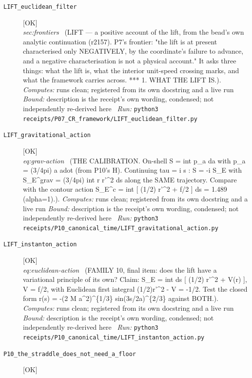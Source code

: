 \begin{description}
\item[\label{rcpt:LIFT_euclidean_filter}\texttt{LIFT\_euclidean\_filter}]\hfill\textsf{[OK]}\\
\textit{sec:frontiers} \ (LIFT --- a positive account of the lift, from the bead's own analytic continuation (r2157). P7's frontier: "the lift is at present characterised only NEGATIVELY, by the coordinate's failure to advance, and a negative characterisation is not a physical account." It asks three things: what the lift is, what the interior unit-speed crossing marks, and what the framework carries across. *** 1. WHAT THE LIFT IS.). 
\emph{Computes:} runs clean; registered from its own docstring and a live run
 \emph{Bound:} description is the receipt's own wording, condensed; not independently re-derived here
\ \emph{Run:} \texttt{python3 receipts/P07\_CR\_framework/LIFT\_euclidean\_filter.py}
\item[\label{rcpt:LIFT_gravitational_action}\texttt{LIFT\_gravitational\_action}]\hfill\textsf{[OK]}\\
\textit{eq:grav-action} \ (THE CALIBRATION. On-shell S = int p\_a da with p\_a = (3/4pi) a adot (from P10's H). Continuing tau = i s : S = -i S\_E with S\_E\textasciicircum{}grav = (3/4pi) int r r'\textasciicircum{}2 ds along the SAME trajectory. Compare with the contour action S\_E\textasciicircum{}c = int [ (1/2) r'\textasciicircum{}2 + f/2 ] ds = 1.489 (alpha=1).). 
\emph{Computes:} runs clean; registered from its own docstring and a live run
 \emph{Bound:} description is the receipt's own wording, condensed; not independently re-derived here
\ \emph{Run:} \texttt{python3 receipts/P10\_canonical\_time/LIFT\_gravitational\_action.py}
\item[\label{rcpt:LIFT_instanton_action}\texttt{LIFT\_instanton\_action}]\hfill\textsf{[OK]}\\
\textit{eq:euclidean-action} \ (FAMILY 10, final item: does the lift have a variational principle of its own? Claim: S\_E = int ds [ (1/2) r'\textasciicircum{}2 + V(r) ], V = f/2, with Euclidean first integral (1/2)r'\textasciicircum{}2 - V = -1/2. Test the closed form r(s) = -(2 M a\textasciicircum{}2)\textasciicircum{}\{1/3\} \textbar{}sin(3s/2a)\textbar{}\textasciicircum{}\{2/3\} against BOTH.). 
\emph{Computes:} runs clean; registered from its own docstring and a live run
 \emph{Bound:} description is the receipt's own wording, condensed; not independently re-derived here
\ \emph{Run:} \texttt{python3 receipts/P10\_canonical\_time/LIFT\_instanton\_action.py}
\item[\label{rcpt:P10_the_straddle_does_not_need_a_floor}\texttt{P10\_the\_straddle\_does\_not\_need\_a\_floor}]\hfill\textsf{[OK]}\\

\end{description}
